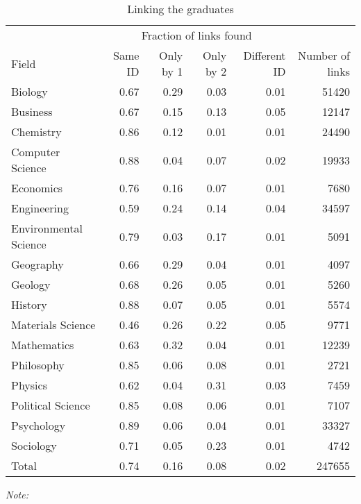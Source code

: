 \begin{table}

\caption{\label{tab:compare_linking_graduates}Linking the graduates}
\centering
\fontsize{9}{11}\selectfont
\begin{threeparttable}
\begin{tabular}[t]{lrrrrr}
\toprule
\multicolumn{1}{c}{ } & \multicolumn{4}{c}{Fraction of links found} & \multicolumn{1}{c}{ } \\
Field & Same ID & Only by 1 & Only by 2 & Different ID & Number of links\\
\midrule
Biology & 0.67 & 0.29 & 0.03 & 0.01 & 51420\\
Business & 0.67 & 0.15 & 0.13 & 0.05 & 12147\\
Chemistry & 0.86 & 0.12 & 0.01 & 0.01 & 24490\\
Computer Science & 0.88 & 0.04 & 0.07 & 0.02 & 19933\\
Economics & 0.76 & 0.16 & 0.07 & 0.01 & 7680\\
\addlinespace
Engineering & 0.59 & 0.24 & 0.14 & 0.04 & 34597\\
Environmental Science & 0.79 & 0.03 & 0.17 & 0.01 & 5091\\
Geography & 0.66 & 0.29 & 0.04 & 0.01 & 4097\\
Geology & 0.68 & 0.26 & 0.05 & 0.01 & 5260\\
History & 0.88 & 0.07 & 0.05 & 0.01 & 5574\\
\addlinespace
Materials Science & 0.46 & 0.26 & 0.22 & 0.05 & 9771\\
Mathematics & 0.63 & 0.32 & 0.04 & 0.01 & 12239\\
Philosophy & 0.85 & 0.06 & 0.08 & 0.01 & 2721\\
Physics & 0.62 & 0.04 & 0.31 & 0.03 & 7459\\
Political Science & 0.85 & 0.08 & 0.06 & 0.01 & 7107\\
\addlinespace
Psychology & 0.89 & 0.06 & 0.04 & 0.01 & 33327\\
Sociology & 0.71 & 0.05 & 0.23 & 0.01 & 4742\\
\midrule
Total & 0.74 & 0.16 & 0.08 & 0.02 & 247655\\
\bottomrule
\end{tabular}
\begin{tablenotes}[para]
\small
\item \textit{Note: } 

\end{tablenotes}
\end{threeparttable}
\end{table}
